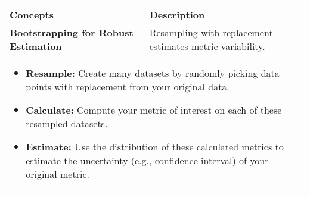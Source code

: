 \begin{summary}
    \begin{center}
        \begin{tabular}{ll}
        \toprule
        \textbf{Concepts} & \textbf{Description} \\
        \midrule
        \textbf{Bootstrapping for Robust Estimation} & Resampling with replacement estimates metric variability. \\
        \multicolumn{2}{p{\linewidth}}{
        \begin{itemize}
            \item \textbf{Resample:} Create many datasets by randomly picking data points with replacement from your original data.
            \item \textbf{Calculate:} Compute your metric of interest on each of these resampled datasets.
            \item \textbf{Estimate:} Use the distribution of these calculated metrics to estimate the uncertainty (e.g., confidence interval) of your original metric.
        \end{itemize}} \\
        \bottomrule
        \end{tabular}
    \end{center}
\end{summary}
\newpage

